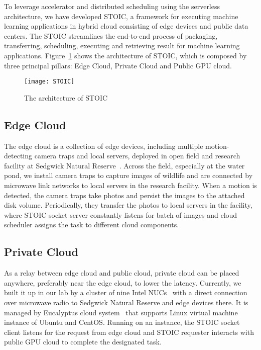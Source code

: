 To leverage accelerator and distributed scheduling using the serverless architecture, we have developed STOIC, a framework for executing machine learning applications in hybrid cloud consisting of edge devices and public data centers. The STOIC streamlines the end-to-end process of packaging, transferring, scheduling, executing and retrieving result for machine learning applications. Figure~\ref{fig:STOIC} shows the architecture of STOIC, which is composed by three principal pillars: Edge Cloud, Private Cloud and Public GPU cloud.

\begin{figure}[t] \centering 
\texttt{[image: STOIC]}
\caption{The architecture of STOIC
\label{fig:STOIC}}
\end{figure}

\subsection{Edge Cloud}
 The edge cloud is a collection of edge devices, including multiple motion-detecting camera traps and local servers, deployed in open field and research facility at Sedgwick Natural Reserve~\cite{ref:sedgwick}. Across the field, especially at the water pond, we install camera traps to capture images of wildlife and are connected by microwave link networks to local servers in the research facility. When a motion is detected, the camera traps take photos and persist the images to the attached disk volume. Periodically, they transfer the photos to local servers in the facility, where STOIC socket server constantly listens for batch of images and cloud scheduler assigns the task to different cloud components. 
 
 \subsection{Private Cloud}
 
 As a relay between edge cloud and public cloud, private cloud can be placed anywhere, preferably near the edge cloud, to lower the latency. Currently, we built it up in our lab by a cluster of nine Intel NUCs~\cite{ref:nucs} with a direct connection over microwave radio to Sedgwick Natural Reserve and edge devices there. It is managed by Eucalyptus cloud system~\cite{ref:euca} that supports Linux virtual machine instance of Ubuntu and CentOS. Running on an instance, the STOIC socket client listens for the request from edge cloud and STOIC requester interacts with public GPU cloud to complete the designated task.
 
